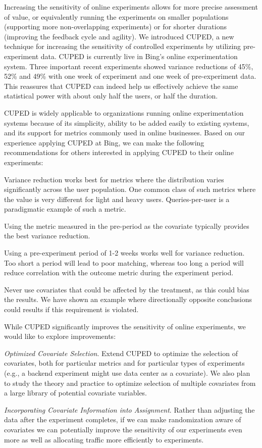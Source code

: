 \documentclass{sig-alternate}
\begin{document}
Increasing the sensitivity of online experiments allows for more precise assessment of value, or equivalently running the experiments on smaller populations (supporting more non-overlapping experiments) or for shorter durations (improving the feedback cycle and agility). We introduced CUPED, a new technique for increasing the sensitivity of controlled experiments by utilizing pre-experiment data. CUPED is currently live in Bing's online experimentation system. Three important recent experiments showed variance reductions of  45\%, 52\% and 49\% with one week of experiment and one week of pre-experiment data. This reassures that CUPED can indeed help us effectively achieve the same statistical power with about only half the users, or half the duration.

CUPED is widely applicable to organizations running online experimentation systems because of its simplicity, ability to be added easily to existing systems, and its support for metrics commonly used in online businesses. Based on our experience applying CUPED at Bing, we can make the following recommendations for others interested in applying CUPED to their online experiments: 
\begin{compactitem}
\item Variance reduction works best for metrics where the distribution varies significantly across the user population. One common class of such metrics where the value is very different for light and heavy users. Queries-per-user is a paradigmatic example of such a metric.
\item Using the metric measured in the pre-period as the covariate typically provides the best variance reduction.
\item Using a pre-experiment period of 1-2 weeks works well for variance reduction. Too short a period will lead to poor matching, whereas too long a period will reduce correlation with the outcome metric during the experiment period. 
\item Never use covariates that could be affected by the treatment, as this could bias the results.  We have shown an example where directionally opposite conclusions could results if this requirement is violated.
\end{compactitem}
While CUPED significantly improves the sensitivity of online experiments, we would like to explore improvements: 
\begin{compactitem}
\item \emph{Optimized Covariate Selection}. Extend CUPED to optimize the selection of covariates, both for particular metrics and for particular types of experiments (e.g., a backend experiment might use data center as a covariate). We also plan to study the theory and practice to optimize selection of multiple covariates from a large library of potential covariate variables. 
\item \emph{Incorporating Covariate Information into Assignment}. Rather than adjusting the data after the experiment completes, if we can make randomization aware of covariates we can potentially improve  the sensitivity of our experiments even more as well as allocating traffic more efficiently to experiments. 
\end{compactitem}
\end{document}
